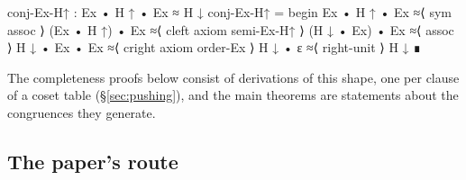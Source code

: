 \noindent\begin{minipage}[c]{0.56\textwidth}
\begin{code}
conj-Ex-H↑ : Ex • H ↑ • Ex ≈ H ↓
conj-Ex-H↑ = begin
  Ex • H ↑ • Ex    ≈⟨ sym assoc ⟩
  (Ex • H ↑) • Ex  ≈⟨ cleft axiom semi-Ex-H↑ ⟩
  (H ↓ • Ex) • Ex  ≈⟨ assoc ⟩
  H ↓ • Ex • Ex    ≈⟨ cright axiom order-Ex ⟩
  H ↓ • ε          ≈⟨ right-unit ⟩
  H ↓ ∎
\end{code}
\end{minipage}\hfill
\begin{minipage}[c]{0.42\textwidth}\centering
{}
\end{minipage}

\noindent The completeness proofs below consist of derivations of this
shape, one per clause of a coset table (\S\ref{sec:pushing}), and the
main theorems are statements about the congruences they generate.

\subsection{The paper's route}

